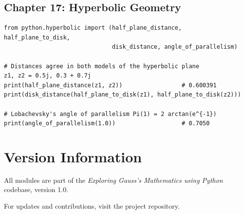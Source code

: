 \subsection{Chapter 17: Hyperbolic Geometry}
\begin{lstlisting}[style=python]
from python.hyperbolic import (half_plane_distance, half_plane_to_disk,
                               disk_distance, angle_of_parallelism)

# Distances agree in both models of the hyperbolic plane
z1, z2 = 0.5j, 0.3 + 0.7j
print(half_plane_distance(z1, z2))                 # 0.600391
print(disk_distance(half_plane_to_disk(z1), half_plane_to_disk(z2)))

# Lobachevsky's angle of parallelism Pi(1) = 2 arctan(e^{-1})
print(angle_of_parallelism(1.0))                   # 0.7050
\end{lstlisting}

\section{Version Information}

All modules are part of the \textit{Exploring Gauss's Mathematics using Python} codebase, version 1.0.

For updates and contributions, visit the project repository.